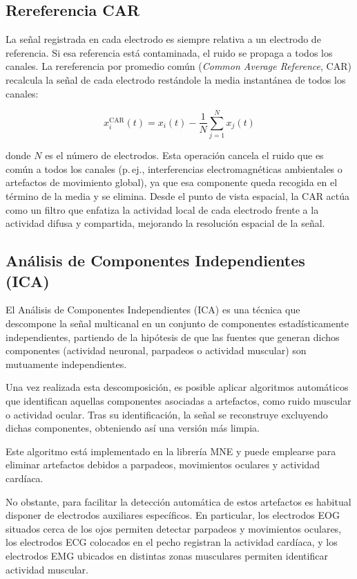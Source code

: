 \subsection{Rereferencia CAR}
\label{subsec:car}

La señal registrada en cada electrodo es siempre relativa a un electrodo de referencia. Si esa referencia está contaminada, el ruido se propaga a todos los canales. La rereferencia por promedio común (\textit{Common Average Reference}, CAR) recalcula la señal de cada electrodo restándole la media instantánea de todos los canales:

\begin{equation}
    x_i^{\text{CAR}}(t) = x_i(t) - \frac{1}{N}\sum_{j=1}^{N} x_j(t)
\end{equation}

donde $N$ es el número de electrodos. Esta operación cancela el ruido que es común a todos los canales (p.\,ej., interferencias electromagnéticas ambientales o artefactos de movimiento global), ya que esa componente queda recogida en el término de la media y se elimina. Desde el punto de vista espacial, la CAR actúa como un filtro que enfatiza la actividad local de cada electrodo frente a la actividad difusa y compartida, mejorando la resolución espacial de la señal. 

\subsection{Análisis de Componentes Independientes (ICA)}
\label{subsec:ica}

El Análisis de Componentes Independientes (ICA) es una técnica que descompone la señal multicanal en un conjunto de componentes estadísticamente independientes, partiendo de la hipótesis de que las fuentes que generan dichos componentes (actividad neuronal, parpadeos o actividad muscular) son mutuamente independientes.

Una vez realizada esta descomposición, es posible aplicar algoritmos automáticos que identifican aquellas componentes asociadas a artefactos, como ruido muscular o actividad ocular. Tras su identificación, la señal se reconstruye excluyendo dichas componentes, obteniendo así una versión más limpia.

Este algoritmo está implementado en la librería MNE y puede emplearse para eliminar artefactos debidos a parpadeos, movimientos oculares y actividad cardíaca.

No obstante, para facilitar la detección automática de estos artefactos es habitual disponer de electrodos auxiliares específicos. En particular, los electrodos EOG situados cerca de los ojos permiten detectar parpadeos y movimientos oculares, los electrodos ECG colocados en el pecho registran la actividad cardíaca, y los electrodos EMG ubicados en distintas zonas musculares permiten identificar actividad muscular.

